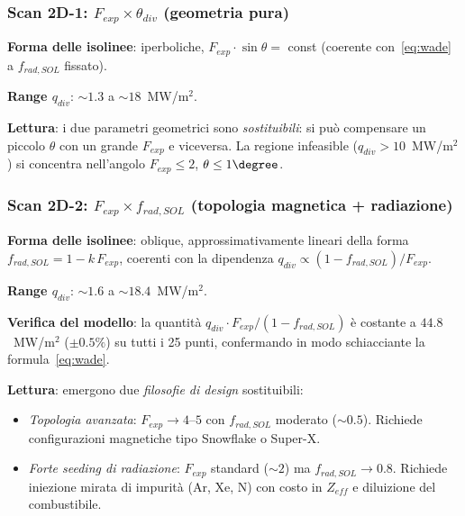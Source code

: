 \subsubsection{Scan 2D-1: $F_{exp} \times \theta_{div}$ (geometria pura)}

\textbf{Forma delle isolinee}: iperboliche, $F_{exp} \cdot \sin\theta = $ const
(coerente con~\eqref{eq:wade} a $f_{rad,SOL}$ fissato).

\textbf{Range $q_{div}$}: $\sim 1.3$ a $\sim 18$~MW/m$^2$.

\textbf{Lettura}: i due parametri geometrici sono \emph{sostituibili}:
si può compensare un piccolo $\theta$ con un grande $F_{exp}$ e viceversa.
La regione infeasible ($q_{div} > 10$~MW/m$^2$) si concentra nell'angolo
$F_{exp} \le 2$, $\theta \le 1\degree$.


\subsubsection{Scan 2D-2: $F_{exp} \times f_{rad,SOL}$
               (topologia magnetica + radiazione)}

\textbf{Forma delle isolinee}: oblique, approssimativamente lineari della
forma $f_{rad,SOL} = 1 - k\, F_{exp}$, coerenti con la dipendenza
$q_{div} \propto (1-f_{rad,SOL})/F_{exp}$.

\textbf{Range $q_{div}$}: $\sim 1.6$ a $\sim 18.4$~MW/m$^2$.

\textbf{Verifica del modello}: la quantità
$q_{div} \cdot F_{exp} / (1 - f_{rad,SOL})$ è costante a
$44.8$~MW/m$^2$ ($\pm 0.5\%$) su tutti i 25 punti, confermando in modo
schiacciante la formula~\eqref{eq:wade}.

\textbf{Lettura}: emergono due \emph{filosofie di design} sostituibili:
\begin{itemize}
    \item \emph{Topologia avanzata}: $F_{exp} \to 4$--$5$ con $f_{rad,SOL}$
          moderato ($\sim 0.5$). Richiede configurazioni magnetiche tipo
          Snowflake o Super-X.
    \item \emph{Forte seeding di radiazione}: $F_{exp}$ standard ($\sim 2$)
          ma $f_{rad,SOL} \to 0.8$. Richiede iniezione mirata di impurità
          (Ar, Xe, N) con costo in $Z_{eff}$ e diluizione del combustibile.
\end{itemize}

